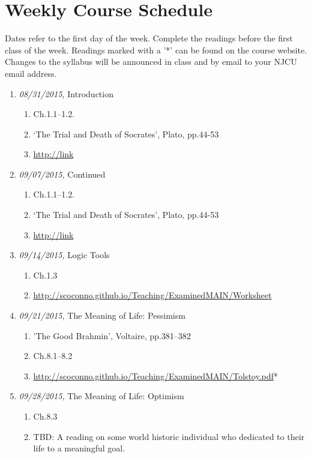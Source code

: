 \documentclass[11pt,article,oneside]{memoir}
\begin{document}
\section{Weekly Course Schedule}
Dates refer to the first day of the week. Complete the readings before the first class of the week. Readings marked with a '*' can be found on the course website. Changes to the syllabus will be announced in class and by email to your NJCU email address.  
\begin{enumerate}

\item \textit{08/31/2015,} Introduction 
\begin{enumerate}
\item Ch.1.1--1.2.
\item `The Trial and Death of Socrates', Plato, pp.44-53
\item \href{Animation of Plato's Cave}{http://link}
\end{enumerate}

\item \textit{09/07/2015,} Continued
\begin{enumerate}
\item Ch.1.1--1.2.
\item `The Trial and Death of Socrates', Plato, pp.44-53
\item \href{Animation of Plato's Cave}{http://link}
\end{enumerate}

\item \textit{09/14/2015,} Logic Tools 
\begin{enumerate}
\item Ch.1.3
\item \href{Handout}{http://scoconno.github.io/Teaching/ExaminedMAIN/Worksheet}
\end{enumerate}

\item \textit{09/21/2015,} The Meaning of Life: Pessimism 
\begin{enumerate}
\item 'The Good Brahmin', Voltaire, pp.381--382
\item Ch.8.1--8.2 
\item \href{`A Confession', Leo Tolstoy}{http://scoconno.github.io/Teaching/ExaminedMAIN/Tolstoy.pdf}* 
\end{enumerate}

\item \textit{09/28/2015,} The Meaning of Life: Optimism
\begin{enumerate}
\item Ch.8.3
\item TBD: A reading on some world historic individual who dedicated to their life to a meaningful goal.
\end{enumerate}


\end{enumerate}
\end{document}
